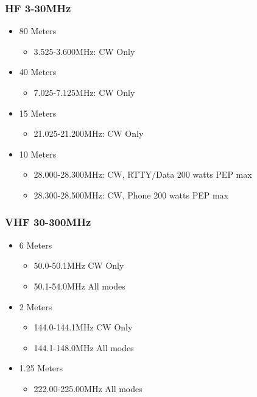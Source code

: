 \documentclass[10pt]{beamer}
\begin{document}
\begin{frame}
\frametitle{HF 3-30MHz}
	\begin{itemize}
	\item 80 Meters
		\begin{itemize}
		\item 3.525-3.600MHz: CW Only
		\end{itemize}
	\item 40 Meters
		\begin{itemize}
		\item 7.025-7.125MHz: CW Only
		\end{itemize}
	\item 15 Meters
		\begin{itemize}
		\item 21.025-21.200MHz: CW Only
		\end{itemize}
	\item 10 Meters 
		\begin{itemize}
		\item  28.000-28.300MHz: CW, RTTY/Data 200 watts PEP max 
		\item 28.300-28.500MHz: CW, Phone 200 watts PEP max
		\end{itemize}
	\end{itemize}
\end{frame}

\begin{frame}
\frametitle{VHF 30-300MHz}
	\begin{itemize}
	\item 6 Meters
		\begin{itemize}
		\item 50.0-50.1MHz CW Only
		\item 50.1-54.0MHz All modes
		\end{itemize}
	\item 2 Meters
		\begin{itemize}
		\item  144.0-144.1MHz CW Only
		\item 144.1-148.0MHz All modes
		\end{itemize}
	\item 1.25 Meters
		\begin{itemize}
		\item 222.00-225.00MHz All modes
		\end{itemize}
	\end{itemize}
\end{frame}
\end{document}
